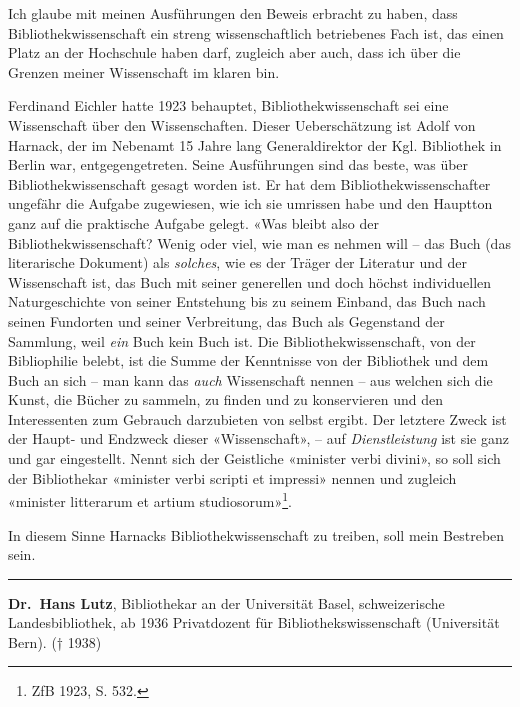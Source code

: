 \documentclass[a4paper,
fontsize=11pt,
oneside,
numbers=noperiodatend,
parskip=half-,
bibliography=totoc,
final
]{scrartcl}
\begin{document}
Ich glaube mit meinen Ausführungen den Beweis erbracht zu haben, dass
Bibliothekwissenschaft ein streng wissenschaftlich betriebenes Fach ist,
das einen Platz an der Hochschule haben darf, zugleich aber auch, dass
ich über die Grenzen meiner Wissenschaft im klaren bin.

Ferdinand Eichler hatte 1923 behauptet, Bibliothekwissenschaft sei eine
Wissenschaft über den Wissenschaften. Dieser Ueberschätzung ist Adolf
von Harnack, der im Nebenamt 15 Jahre lang Generaldirektor der Kgl.
Bibliothek in Berlin war, entgegengetreten. Seine Ausführungen sind das
beste, was über Bibliothekwissenschaft gesagt worden ist. Er hat dem
Bibliothekwissenschafter ungefähr die Aufgabe zugewiesen, wie ich sie
umrissen habe und den Hauptton ganz auf die praktische Aufgabe gelegt.
«Was bleibt also der Bibliothekwissenschaft? Wenig oder viel, wie man es
nehmen will -- das Buch (das literarische Dokument) als \emph{solches},
wie es der Träger der Literatur und der Wissenschaft ist, das Buch mit
seiner generellen und doch höchst individuellen Naturgeschichte von
seiner Entstehung bis zu seinem Einband, das Buch nach seinen Fundorten
und seiner Verbreitung, das Buch als Gegenstand der Sammlung, weil
\emph{ein} Buch kein Buch ist. Die Bibliothekwissenschaft, von der
Bibliophilie belebt, ist die Summe der Kenntnisse von der Bibliothek und
dem Buch an sich -- man kann das \emph{auch} Wissenschaft nennen -- aus
welchen sich die Kunst, die Bücher zu sammeln, zu finden und zu
konservieren und den Interessenten zum Gebrauch darzubieten von selbst
ergibt. Der letztere Zweck ist der Haupt- und Endzweck dieser
«Wissenschaft», -- auf \emph{Dienstleistung} ist sie ganz und gar
eingestellt. Nennt sich der Geistliche «minister verbi divini», so soll
sich der Bibliothekar «minister verbi scripti et impressi» nennen und
zugleich «minister litterarum et artium studiosorum»\footnote{ZfB 1923,
  S. 532.}.

In diesem Sinne Harnacks Bibliothekwissenschaft zu treiben, soll mein
Bestreben sein.

\begin{center}\rule{0.5\linewidth}{\linethickness}\end{center}

\textbf{Dr.~Hans Lutz}, Bibliothekar an der Universität Basel,
schweizerische Landesbibliothek, ab 1936 Privatdozent für
Bibliothekswissenschaft (Universität Bern). († 1938)
\end{document}
